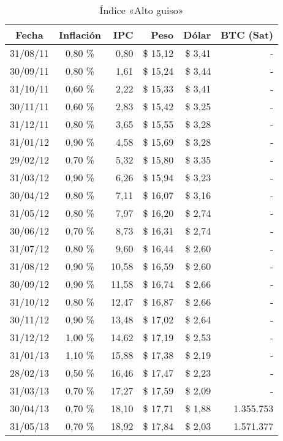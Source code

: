 \begin{center}
\begin{longtable}{|c|c|r|r|r|r|}
\caption{Índice «Alto guiso»} \\
\hline
\textbf{Fecha} & \textbf{Inflación} & \textbf{IPC} & \textbf{Peso} & \textbf{Dólar} & \textbf{BTC (Sat)} \\ \hline
31/08/11 & 0,80 \% & 0,80 & \$ 15,12 & \$ 3,41 & - \\ \hline
30/09/11 & 0,80 \% & 1,61 & \$ 15,24 & \$ 3,44 & - \\ \hline
31/10/11 & 0,60 \% & 2,22 & \$ 15,33 & \$ 3,41 & - \\ \hline
30/11/11 & 0,60 \% & 2,83 & \$ 15,42 & \$ 3,25 & - \\ \hline
31/12/11 & 0,80 \% & 3,65 & \$ 15,55 & \$ 3,28 & - \\ \hline
31/01/12 & 0,90 \% & 4,58 & \$ 15,69 & \$ 3,28 & - \\ \hline
29/02/12 & 0,70 \% & 5,32 & \$ 15,80 & \$ 3,35 & - \\ \hline
31/03/12 & 0,90 \% & 6,26 & \$ 15,94 & \$ 3,23 & - \\ \hline
30/04/12 & 0,80 \% & 7,11 & \$ 16,07 & \$ 3,16 & - \\ \hline
31/05/12 & 0,80 \% & 7,97 & \$ 16,20 & \$ 2,74 & - \\ \hline
30/06/12 & 0,70 \% & 8,73 & \$ 16,31 & \$ 2,74 & - \\ \hline
31/07/12 & 0,80 \% & 9,60 & \$ 16,44 & \$ 2,60 & - \\ \hline
31/08/12 & 0,90 \% & 10,58 & \$ 16,59 & \$ 2,60 & - \\ \hline
30/09/12 & 0,90 \% & 11,58 & \$ 16,74 & \$ 2,66 & - \\ \hline
31/10/12 & 0,80 \% & 12,47 & \$ 16,87 & \$ 2,66 & - \\ \hline
30/11/12 & 0,90 \% & 13,48 & \$ 17,02 & \$ 2,64 & - \\ \hline
31/12/12 & 1,00 \% & 14,62 & \$ 17,19 & \$ 2,53 & - \\ \hline
31/01/13 & 1,10 \% & 15,88 & \$ 17,38 & \$ 2,19 & - \\ \hline
28/02/13 & 0,50 \% & 16,46 & \$ 17,47 & \$ 2,23 & - \\ \hline
31/03/13 & 0,70 \% & 17,27 & \$ 17,59 & \$ 2,09 & - \\ \hline
30/04/13 & 0,70 \% & 18,10 & \$ 17,71 & \$ 1,88 & 1.355.753 \\ \hline
31/05/13 & 0,70 \% & 18,92 & \$ 17,84 & \$ 2,03 & 1.571.377 \\ \hline

\end{longtable}
\end{center}
